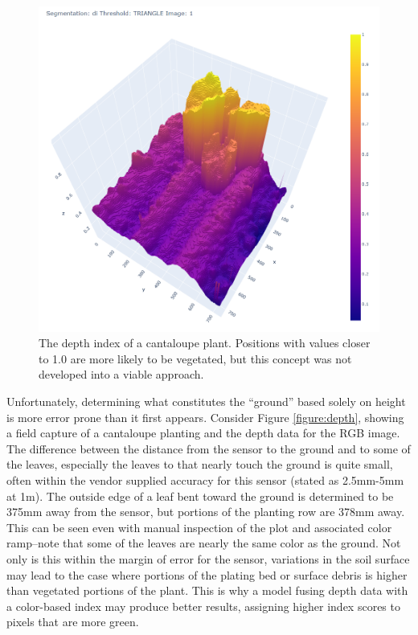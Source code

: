 \documentclass[letterpaper, notitlepage]{report}
\begin{document}
 \begin{figure}[H]
	\centering
	\includegraphics[width=0.8\linewidth]{./figures/depth-index.png}
	\caption[Depth Index]{The depth index of a cantaloupe plant.  Positions with values closer to 1.0 are more likely to be vegetated, but this concept was not developed into a viable approach.}
	\label{fig:depth}
\end{figure}

Unfortunately, determining what constitutes the ``ground'' based solely on height is more error prone than it first appears.  Consider Figure \ref{figure:depth}, showing a field capture of a cantaloupe planting and the depth data for the RGB image. The difference between the distance from the sensor to the ground and to some of the leaves, especially the leaves to that nearly touch the ground is quite small, often within the vendor supplied accuracy for this sensor (stated as 2.5mm-5mm at 1m). The outside edge of a leaf bent toward the ground is determined to be 375mm away from the sensor, but portions of the planting row are 378mm away. This can be seen even with manual inspection of the plot and associated color ramp--note that some of the leaves are nearly the same color as the ground. Not only is this within the margin of error for the sensor, variations in the soil surface may lead to the case where portions of the plating bed or surface debris is higher than vegetated portions of the plant. This is why a model fusing depth data with a color-based index may produce better results, assigning higher index scores to pixels that are more green.


%
\end{document}
